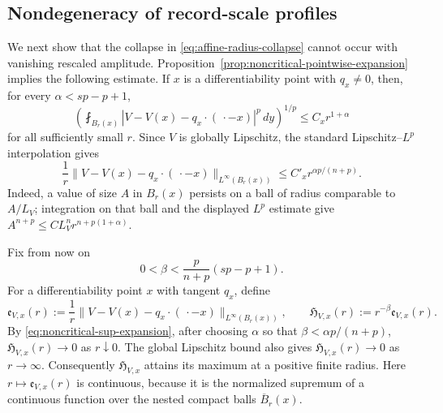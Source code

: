 \documentclass[11pt,reqno]{amsart}
\numberwithin{equation}{section}
\newcommand{\dd}{\,d}
\theoremstyle{remark}
\begin{document}
\subsection{Nondegeneracy of record-scale profiles}
\label{subsec:record-scale-nondegeneracy}

We next show that the collapse in
\eqref{eq:affine-radius-collapse} cannot occur with vanishing rescaled
amplitude.  Proposition~\ref{prop:noncritical-pointwise-expansion}
implies the following estimate.  If
$x$ is a differentiability point with $q_x\ne0$, then, for every
$\alpha<sp-p+1$,
\[
 \left(\fint_{B_r(x)}
 |V-V(x)-q_x\cdot(\,\cdot-x)|^p\dd y\right)^{1/p}
 \le C_xr^{1+\alpha}
\]
for all sufficiently small $r$.  Since $V$ is globally Lipschitz, the
standard Lipschitz--$L^p$ interpolation gives
\begin{equation}
 \frac1r\|V-V(x)-q_x\cdot(\,\cdot-x)\|_{L^\infty(B_r(x))}
 \le C'_xr^{\alpha p/(n+p)}.
 \label{eq:noncritical-sup-expansion}
\end{equation}
Indeed, a value of size $A$ in $B_r(x)$ persists on a ball of radius
comparable to $A/L_V$; integration on that ball and the displayed
$L^p$ estimate give $A^{n+p}\le C L_V^n r^{n+p(1+\alpha)}$.

Fix from now on
\begin{equation*}
 0<\beta<\frac{p}{n+p}(sp-p+1).
\end{equation*}
For a differentiability point $x$ with tangent $q_x$, define
\begin{equation*}
 \mathfrak e_{V,x}(r):=
 \frac1r\|V-V(x)-q_x\cdot(\,\cdot-x)\|_{L^\infty(B_r(x))},
 \qquad
 \mathfrak H_{V,x}(r):=r^{-\beta}\mathfrak e_{V,x}(r).
\end{equation*}
By \eqref{eq:noncritical-sup-expansion}, after choosing
$\alpha$ so that $\beta<\alpha p/(n+p)$,
$\mathfrak H_{V,x}(r)\to0$ as $r\downarrow0$.  The global Lipschitz bound
also gives $\mathfrak H_{V,x}(r)\to0$ as $r\to\infty$.  Consequently
$\mathfrak H_{V,x}$ attains its maximum at a positive finite radius.
Here \(r\mapsto\mathfrak e_{V,x}(r)\) is continuous, because it is the
normalized supremum of a continuous function over the nested compact
balls \(\overline B_r(x)\).
\end{document}
